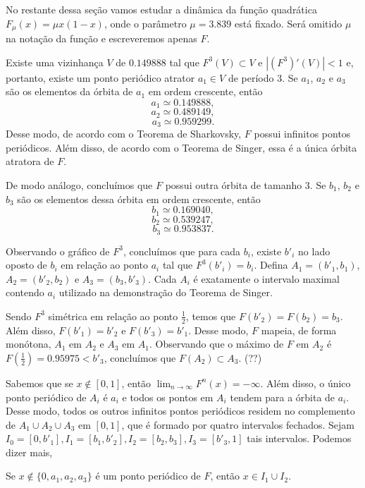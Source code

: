 No restante dessa seção vamos estudar a dinâmica da função quadrática $F_\mu(x) = \mu x(1-x)$, onde o parâmetro $\mu = 3.839$ está fixado. Será omitido $\mu$ na notação da função e escreveremos apenas $F$.

Existe uma vizinhança $V$ de $0.149888$ tal que $F^3(V) \subset V$ e $|(F^3)'(V)| < 1$ e, portanto, existe um ponto periódico atrator $a_1 \in V$ de período $3$. Se $a_1$, $a_2$ e $a_3$ são os elementos da órbita de $a_1$ em ordem crescente, então
$$a_1 \simeq 0.149888,$$
$$a_2 \simeq 0.489149,$$
$$a_3 \simeq 0.959299.$$
Desse modo, de acordo com o Teorema de Sharkovsky, $F$ possui infinitos pontos periódicos. Além disso, de acordo com o Teorema de Singer, essa é a única órbita atratora de $F$.

De modo análogo, concluímos que $F$ possui outra órbita de tamanho $3$. Se $b_1$, $b_2$ e $b_3$ são os elementos dessa órbita em ordem crescente, então
$$b_1 \simeq 0.169040,$$
$$b_2 \simeq 0.539247,$$
$$b_3 \simeq 0.953837.$$

Observando o gráfico de $F^3$, concluímos que para cada $b_i$, existe $b'_i$ no lado oposto de $b_i$ em relação ao ponto $a_i$ tal que $F^3(b'_i) = b_i$. Defina $A_1 = (b'_1, b_1)$, $A_2 = (b'_2, b_2)$ e $A_3 = (b_3, b'_3)$. Cada $A_i$ é exatamente o intervalo maximal contendo $a_i$ utilizado na demonstração do Teorema de Singer.

Sendo $F^3$ simétrica em relação ao ponto $\frac{1}{2}$, temos que $F(b'_2) = F(b_2) = b_3$. Além disso, $F(b'_1) = b'_2$ e $F(b'_3) = b'_1$. Desse modo, $F$ mapeia, de forma monótona, $A_1$ em $A_2$ e $A_3$ em $A_1$. Observando que o máximo de $F$ em $A_2$ é $F \left( \frac{1}{2} \right) = 0.95975 < b'_3$, concluímos que $F(A_2) \subset A_3$. (??)

Sabemos que se $x \notin [0, 1]$, então $\lim_{n \to \infty} F^n(x) = -\infty$. Além disso, o único ponto periódico de $A_i$ é $a_i$ e todos os pontos em $A_i$ tendem para a órbita de $a_i$. Desse modo, todos os outros infinitos pontos periódicos residem no complemento de $A_1 \cup A_2 \cup A_3$ em $[0, 1]$, que é formado por quatro intervalos fechados. Sejam $I_0 = [0, b'_1], I_1 = [b_1, b'_2], I_2 = [b_2, b_3], I_3 = [b'_3, 1]$ tais intervalos. Podemos dizer mais,

\begin{proposition}
Se $x \notin \{ 0, a_1, a_2, a_3 \}$ é um ponto periódico de $F$, então $x \in I_1 \cup I_2$.
\end{proposition}


